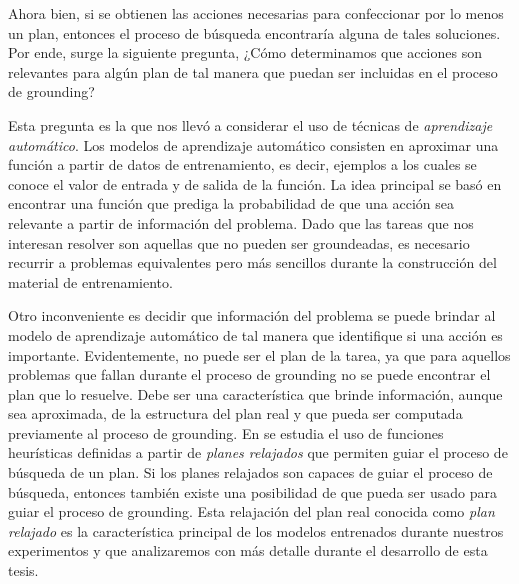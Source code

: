 Ahora bien, si se obtienen las acciones necesarias para confeccionar por lo
menos un plan, entonces el proceso de búsqueda encontraría alguna de tales
soluciones. Por ende, surge la siguiente pregunta, ¿Cómo determinamos que
acciones son relevantes para algún plan de tal manera que puedan ser incluidas
en el proceso de grounding?

Esta pregunta es la que nos llevó a considerar el uso de técnicas de
\emph{aprendizaje automático}. Los modelos de aprendizaje automático consisten
en aproximar una función a partir de datos de entrenamiento, es decir, ejemplos
a los cuales se conoce el valor de entrada y de salida de la función. La idea
principal se basó en encontrar una función que prediga la probabilidad de que
una acción sea relevante a partir de información del problema. Dado que las
tareas que nos interesan resolver son aquellas que no pueden ser groundeadas, es
necesario recurrir a problemas equivalentes pero más sencillos durante la
construcción del material de entrenamiento.

Otro inconveniente es decidir que información del problema se puede brindar al
modelo de aprendizaje automático de tal manera que identifique si una acción es
importante. Evidentemente, no puede ser el plan de la tarea, ya que para
aquellos problemas que fallan durante el proceso de grounding no se puede
encontrar el plan que lo resuelve. Debe ser una característica que brinde
información, aunque sea aproximada, de la estructura del plan real y que pueda
ser computada previamente al proceso de grounding. En \citep{hoffman-2001} se
estudia el uso de funciones heurísticas definidas a partir de \emph{planes
relajados} que permiten guiar el proceso de búsqueda de un plan. Si los planes
relajados son capaces de guiar el proceso de búsqueda, entonces también existe
una posibilidad de que pueda ser usado para guiar el proceso de grounding. Esta
relajación del plan real conocida como \emph{plan relajado} es la característica
principal de los modelos entrenados durante nuestros experimentos y que
analizaremos con más detalle durante el desarrollo de esta tesis.

